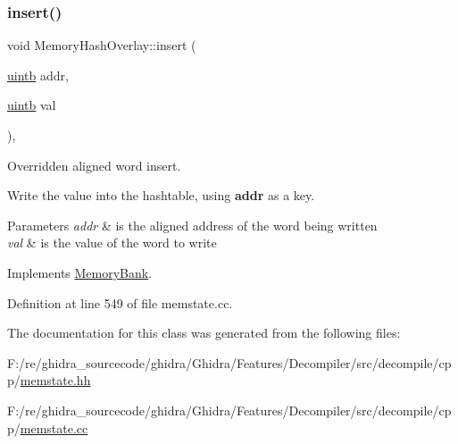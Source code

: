 \subsubsection{\texorpdfstring{insert()}{insert()}}
{\footnotesize\ttfamily void Memory\+Hash\+Overlay\+::insert (\begin{DoxyParamCaption}\item[{\mbox{\hyperlink{types_8h_a2db313c5d32a12b01d26ac9b3bca178f}{uintb}}}]{addr,  }\item[{\mbox{\hyperlink{types_8h_a2db313c5d32a12b01d26ac9b3bca178f}{uintb}}}]{val }\end{DoxyParamCaption})\hspace{0.3cm}{\ttfamily [protected]}, {\ttfamily [virtual]}}



Overridden aligned word insert. 

Write the value into the hashtable, using {\bfseries{addr}} as a key. 
\begin{DoxyParams}{Parameters}
{\em addr} & is the aligned address of the word being written \\
\hline
{\em val} & is the value of the word to write \\
\hline
\end{DoxyParams}


Implements \mbox{\hyperlink{class_memory_bank_abccbb8ba1e2c2ae941b372e90f454e5f}{Memory\+Bank}}.



Definition at line 549 of file memstate.\+cc.



The documentation for this class was generated from the following files\+:\begin{DoxyCompactItemize}
\item 
F\+:/re/ghidra\+\_\+sourcecode/ghidra/\+Ghidra/\+Features/\+Decompiler/src/decompile/cpp/\mbox{\hyperlink{memstate_8hh}{memstate.\+hh}}\item 
F\+:/re/ghidra\+\_\+sourcecode/ghidra/\+Ghidra/\+Features/\+Decompiler/src/decompile/cpp/\mbox{\hyperlink{memstate_8cc}{memstate.\+cc}}\end{DoxyCompactItemize}
